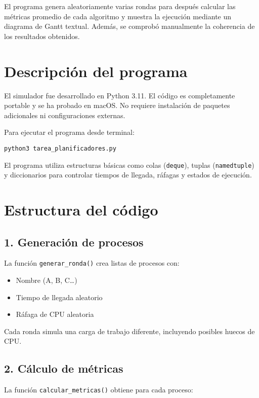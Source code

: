 \documentclass[12pt]{article}
\begin{document}
El programa genera aleatoriamente varias rondas para después calcular las métricas promedio de cada algoritmo y muestra la ejecución mediante un diagrama de Gantt textual. Además, se comprobó manualmente la coherencia de los resultados obtenidos. 

\section*{Descripción del programa}

El simulador fue desarrollado en Python 3.11. El código es completamente portable y se ha probado en macOS. No requiere instalación de paquetes adicionales ni configuraciones externas.  

Para ejecutar el programa desde terminal:

\begin{verbatim}
python3 tarea_planificadores.py
\end{verbatim}

El programa utiliza estructuras básicas como colas (\texttt{deque}), tuplas (\texttt{namedtuple}) y diccionarios para controlar tiempos de llegada, ráfagas y estados de ejecución.

\section*{Estructura del código}

\subsection*{1. Generación de procesos}

La función \texttt{generar\_ronda()} crea listas de procesos con:

\begin{itemize}
    \item Nombre (A, B, C…)
    \item Tiempo de llegada aleatorio
    \item Ráfaga de CPU aleatoria
\end{itemize}

Cada ronda simula una carga de trabajo diferente, incluyendo posibles huecos de CPU.

\subsection*{2. Cálculo de métricas}

La función \texttt{calcular\_metricas()} obtiene para cada proceso:
\end{document}
